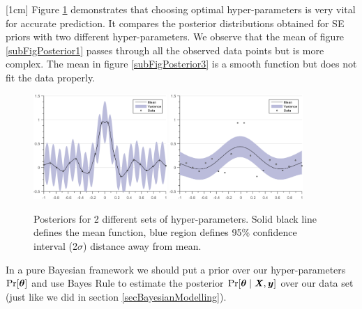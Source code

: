 [1cm]
Figure \ref{figGPRMarginal} demonstrates that choosing optimal hyper-parameters is very vital for accurate prediction. It compares the posterior distributions obtained for SE priors with two different hyper-parameters. We observe that the mean of figure \ref{subFigPosterior1} passes through all the observed data points but is more complex. The mean in figure \ref{subFigPosterior3} is a smooth function but does not fit the data properly. 

  \begin{figure}[!ht]
  \centering
    \subfigure[{Posterior between SE prior with hyper-parameters $(\VEC{\theta} = [0.35, 0.05]; \sigma_{noise} = 0.01)$ and data. }]
  {
        \includegraphics[width=0.45\textwidth]
        {images/part1/posteriorSE1}
        \label{subFigPosterior1}
  }\quad
\subfigure[{Posterior between SE prior with hyper-parameters $(\VEC{\theta} = [0.35, 0.5]; \sigma_{noise} = 0.01)$ and data. }]
  {
        \includegraphics[width=0.45\textwidth]
        {images/part1/posteriorSE3}
        \label{subFigPosterior3}
  }\quad
       \caption{Posteriors for 2 different sets of hyper-parameters. Solid black line defines the mean function, blue region defines 95\% confidence interval (2$\sigma$) distance away from mean. }\label{figGPRMarginal}
\end{figure}

In a pure Bayesian framework we should put a prior over our hyper-parameters $\Pr[\boldsymbol{\theta}]$ and use Bayes Rule to estimate the posterior $\Pr[\boldsymbol{\theta} \mid \bm{\mathit{X}}, \boldsymbol{y}]$ over our data set (just like we did in section \ref{secBayesianModelling}). 

